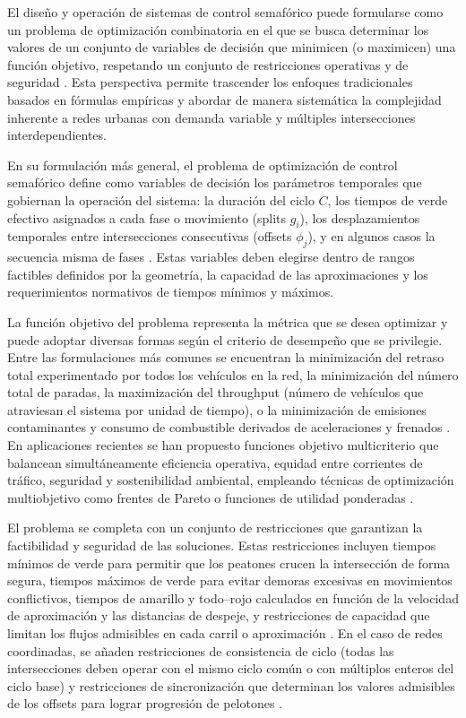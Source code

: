 El diseño y operación de sistemas de control semafórico puede formularse como un problema de optimización combinatoria en el que se busca determinar los valores de un conjunto de variables de decisión que minimicen (o maximicen) una función objetivo, respetando un conjunto de restricciones operativas y de seguridad \cite{wong1998optimizing,hillier1967mixed}. Esta perspectiva permite trascender los enfoques tradicionales basados en fórmulas empíricas y abordar de manera sistemática la complejidad inherente a redes urbanas con demanda variable y múltiples intersecciones interdependientes.

En su formulación más general, el problema de optimización de control semafórico define como variables de decisión los parámetros temporales que gobiernan la operación del sistema: la duración del ciclo $C$, los tiempos de verde efectivo asignados a cada fase o movimiento (splits $g_i$), los desplazamientos temporales entre intersecciones consecutivas (offsets $\phi_j$), y en algunos casos la secuencia misma de fases \cite{wong1998optimizing,garber2019traffic}. Estas variables deben elegirse dentro de rangos factibles definidos por la geometría, la capacidad de las aproximaciones y los requerimientos normativos de tiempos mínimos y máximos.

La función objetivo del problema representa la métrica que se desea optimizar y puede adoptar diversas formas según el criterio de desempeño que se privilegie. Entre las formulaciones más comunes se encuentran la minimización del retraso total experimentado por todos los vehículos en la red, la minimización del número total de paradas, la maximización del throughput (número de vehículos que atraviesan el sistema por unidad de tiempo), o la minimización de emisiones contaminantes y consumo de combustible derivados de aceleraciones y frenados \cite{wong1998optimizing,stevanovic2010adaptive,papageorgiou2003review}. En aplicaciones recientes se han propuesto funciones objetivo multicriterio que balancean simultáneamente eficiencia operativa, equidad entre corrientes de tráfico, seguridad y sostenibilidad ambiental, empleando técnicas de optimización multiobjetivo como frentes de Pareto o funciones de utilidad ponderadas \cite{ceylan2004traffic,stevanovic2010adaptive}.

El problema se completa con un conjunto de restricciones que garantizan la factibilidad y seguridad de las soluciones. Estas restricciones incluyen tiempos mínimos de verde para permitir que los peatones crucen la intersección de forma segura, tiempos máximos de verde para evitar demoras excesivas en movimientos conflictivos, tiempos de amarillo y todo–rojo calculados en función de la velocidad de aproximación y las distancias de despeje, y restricciones de capacidad que limitan los flujos admisibles en cada carril o aproximación \cite{garber2019traffic,fhwa2008signal}. En el caso de redes coordinadas, se añaden restricciones de consistencia de ciclo (todas las intersecciones deben operar con el mismo ciclo común o con múltiplos enteros del ciclo base) y restricciones de sincronización que determinan los valores admisibles de los offsets para lograr progresión de pelotones \cite{erdogan2013coordination,gartner2001arterial}.


